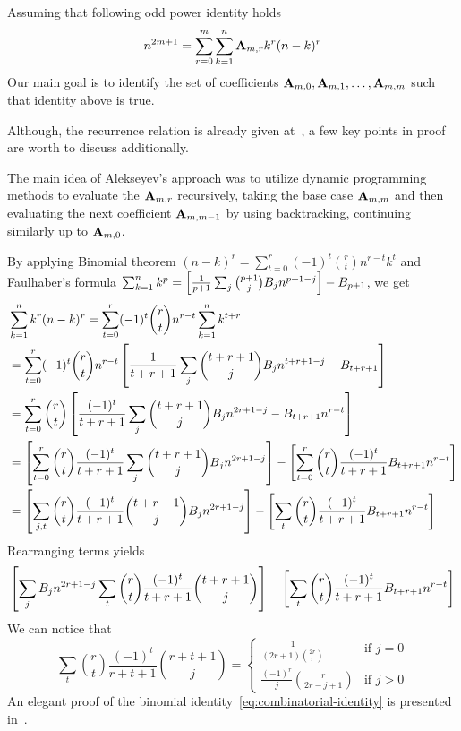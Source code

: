 Assuming that following odd power identity holds
\begin{align}
    \label{eq:odd-power-identity}
    n^{2m+1} = \sum_{r=0}^{m} \sum_{k=1}^{n} {\mathbf{A}} \sb{m,r} k^r (n-k)^r
\end{align}
Our main goal is to identify the set of coefficients ${\mathbf{A}} \sb{m,0}, {\mathbf{A}} \sb{m,1}, \ldots, {\mathbf{A}} \sb{m,m}$
such that identity above is true.

Although, the recurrence relation is already given at~\cite{alekseyev2018mathoverflow}, a few key points in proof
are worth to discuss additionally.

The main idea of Alekseyev's approach was to utilize dynamic programming methods to evaluate the ${\mathbf{A}} \sb{m,r}$ recursively,
taking the base case ${\mathbf{A}} \sb{m,m}$ and then evaluating the next coefficient ${\mathbf{A}} \sb{m,m-1}$
by using backtracking, continuing similarly up to ${\mathbf{A}} \sb{m,0}$.

By applying Binomial theorem $(n-k)^r=\sum_{t=0}^{r} (-1)^t \binom{r}{t} n^{r-t} k^t$ and Faulhaber's formula
$\sum_{k=1}^{n} k^{p} = \left[ \frac{1}{p+1}\sum_{j} \binom{p+1}{j} {B}\sb{j} n^{p+1-j} \right] - {B}\sb{p+1}$, we get
\begin{align*}
    &\sum_{k=1}^{n} k^{r} (n-k)^{r}
    = \sum_{t=0}^{r} (-1)^t \binom{r}{t} n^{r-t} \sum_{k=1}^{n} k^{t+r} \\
    &= \sum_{t=0}^{r} (-1)^t \binom{r}{t} n^{r-t} \left[ \frac{1}{t+r+1} \sum_{j} \binom{t+r+1}{j} {B}\sb{j} n^{t+r+1-j} - {B}\sb{t+r+1} \right] \\
    &= \sum_{t=0}^{r} \binom{r}{t} \left[ \frac{(-1)^t}{t+r+1} \sum_{j} \binom{t+r+1}{j} {B}\sb{j} n^{2r+1-j} - {B}\sb{t+r+1} n^{r-t} \right] \\
    &= \left[ \sum_{t=0}^{r} \binom{r}{t} \frac{(-1)^t}{t+r+1} \sum_{j} \binom{t+r+1}{j} {B}\sb{j} n^{2r+1-j}  \right]
    - \left[ \sum_{t=0}^{r} \binom{r}{t} \frac{(-1)^t}{t+r+1} {B}\sb{t+r+1} n^{r-t} \right] \\
    &= \left[ \sum_{j, t} \binom{r}{t} \frac{(-1)^t}{t+r+1} \binom{t+r+1}{j} {B}\sb{j} n^{2r+1-j}  \right]
    - \left[ \sum_{t} \binom{r}{t} \frac{(-1)^t}{t+r+1} {B}\sb{t+r+1} n^{r-t} \right]
\end{align*}
Rearranging terms yields
\begin{equation}
    \left[ \sum_{j} {B}\sb{j} n^{2r+1-j} \sum_{t} \binom{r}{t} \frac{(-1)^t}{t+r+1} \binom{t+r+1}{j}  \right]
    - \left[ \sum_{t} \binom{r}{t} \frac{(-1)^t}{t+r+1} {B}\sb{t+r+1} n^{r-t} \right]
    \label{eq:rearranging-terms}
\end{equation}
We can notice that
\begin{equation}
    \sum_{t} \binom{r}{t} \frac{(-1)^t}{r+t+1} \binom{r+t+1}{j}
    =\begin{cases}
         \frac{1}{(2r+1) \binom{2r}r} & \text{if } j=0\\
         \frac{(-1)^r}{j} \binom{r}{2r-j+1} & \text{if } j>0
    \end{cases}\label{eq:combinatorial-identity}
\end{equation}
An elegant proof of the binomial identity~\eqref{eq:combinatorial-identity} is presented in~\cite{scheuer2023mathstackexchange}.

